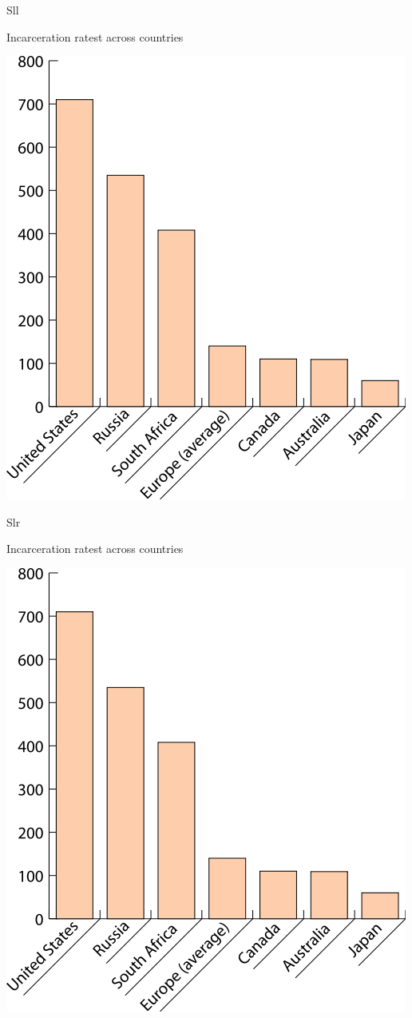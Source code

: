 \begin{chart}{S}{ll}
\caption{Incarceration ratest across countries}
\label{chart:incarceration}
\includegraphics[width=\chartwidth,height=\chartheight]{incarceration}  
\end{chart}

\begin{chart}{S}{lr}
\caption{Incarceration ratest across countries}
\label{chart:incarceration}
\includegraphics[width=\chartwidth,height=\chartheight]{incarceration}  
\end{chart}

